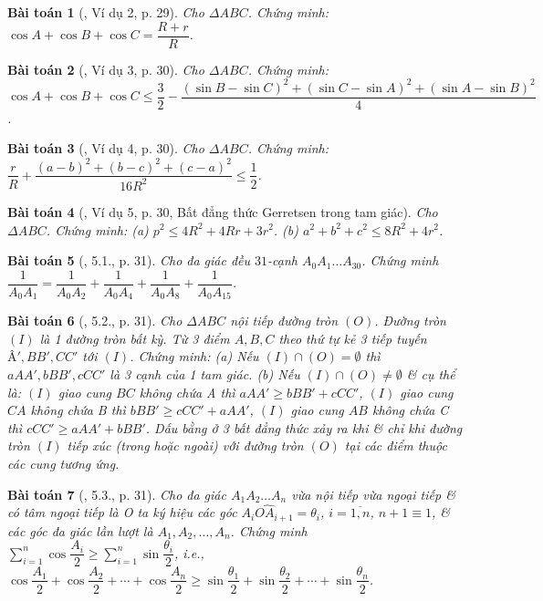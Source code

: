 \documentclass{article}
\newtheorem{baitoan}{Bài toán}
\begin{document}
\begin{baitoan}[\cite{Hung_nang_cao_phat_trien_Toan_11_tap_1}, Ví dụ 2, p. 29]
	Cho $\Delta ABC$. Chứng minh: $\cos A + \cos B + \cos C = \dfrac{R + r}{R}$.
\end{baitoan}

\begin{baitoan}[\cite{Hung_nang_cao_phat_trien_Toan_11_tap_1}, Ví dụ 3, p. 30]
	Cho $\Delta ABC$. Chứng minh: $\cos A + \cos B + \cos C\le\dfrac{3}{2} - \dfrac{(\sin B - \sin C)^2 + (\sin C - \sin A)^2 + (\sin A - \sin B)^2}{4}$.
\end{baitoan}

\begin{baitoan}[\cite{Hung_nang_cao_phat_trien_Toan_11_tap_1}, Ví dụ 4, p. 30]
	Cho $\Delta ABC$. Chứng minh: $\dfrac{r}{R} + \dfrac{(a - b)^2 + (b - c)^2 + (c - a)^2}{16R^2}\le\dfrac{1}{2}$.
\end{baitoan}

\begin{baitoan}[\cite{Hung_nang_cao_phat_trien_Toan_11_tap_1}, Ví dụ 5, p. 30, Bất đẳng thức Gerretsen trong tam giác]
	Cho $\Delta ABC$. Chứng minh: (a) $p^2\le4R^2 + 4Rr + 3r^2$. (b) $a^2 + b^2 + c^2\le8R^2 + 4r^2$.
\end{baitoan}

\begin{baitoan}[\cite{Hung_nang_cao_phat_trien_Toan_11_tap_1}, 5.1., p. 31]
	Cho đa giác đều $31$-cạnh $A_0A_1\ldots A_{30}$. Chứng minh $\dfrac{1}{A_0A_1} = \dfrac{1}{A_0A_2} + \dfrac{1}{A_0A_4} + \dfrac{1}{A_0A_8} + \dfrac{1}{A_0A_{15}}$.
\end{baitoan}

\begin{baitoan}[\cite{Hung_nang_cao_phat_trien_Toan_11_tap_1}, 5.2., p. 31]
	Cho $\Delta ABC$ nội tiếp đường tròn $(O)$. Đường tròn $(I)$ là 1 đường tròn bất kỳ. Từ 3 điểm $A,B,C$ theo thứ tự kẻ 3 tiếp tuyến $Â',BB',CC'$ tới $(I)$. Chứng minh: (a) Nếu $(I)\cap(O) = \emptyset$ thì $aAA',bBB',cCC'$ là 3 cạnh của 1 tam giác. (b) Nếu $(I)\cap(O)\ne\emptyset$ \& cụ thể là: $(I)$ giao cung $BC$ không chứa A thì $aAA'\ge bBB' + cCC'$, $(I)$ giao cung $CA$ không chứa B thì $bBB'\ge cCC' + aAA'$, $(I)$ giao cung $AB$ không chứa C thì $cCC'\ge aAA' + bBB'$. Dấu bằng ở 3 bất đẳng thức xảy ra khi \& chỉ khi đường tròn $(I)$ tiếp xúc (trong hoặc ngoài) với đường tròn $(O)$ tại các điểm thuộc các cung tương ứng.
\end{baitoan}

\begin{baitoan}[\cite{Hung_nang_cao_phat_trien_Toan_11_tap_1}, 5.3., p. 31]
	Cho đa giác $A_1A_2\ldots A_n$ vừa nội tiếp vừa ngoại tiếp \& có tâm ngoại tiếp là O ta ký hiệu các góc $\widehat{A_iOA_{i+1}} = \theta_i$, $i = \overline{1,n}$, $n + 1\equiv1$, \& các góc đa giác lần lượt là $A_1,A_2,\ldots,A_n$. Chứng minh $\sum_{i=1}^n \cos\dfrac{A_i}{2}\ge\sum_{i=1}^n \sin\dfrac{\theta_i}{2}$, i.e., $\cos\dfrac{A_1}{2} + \cos\dfrac{A_2}{2} + \cdots + \cos\dfrac{A_n}{2}\ge\sin\dfrac{\theta_1}{2} + \sin\dfrac{\theta_2}{2} + \cdots + \sin\dfrac{\theta_n}{2}$.
\end{baitoan}
\end{document}
